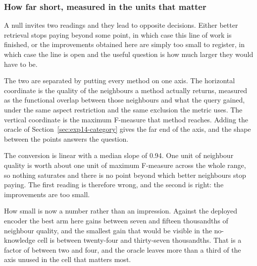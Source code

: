 \subsubsection{How far short, measured in the units that matter}
\label{sec:exp14-conversion}

A null invites two readings and they lead to opposite decisions. Either better
retrieval stops paying beyond some point, in which case this line of work is finished,
or the improvements obtained here are simply too small to register, in which case the
line is open and the useful question is how much larger they would have to be.

The two are separated by putting every method on one axis. The horizontal coordinate
is the quality of the neighbours a method actually returns, measured as the functional
overlap between those neighbours and what the query gained, under the same aspect
restriction and the same exclusion the metric uses. The vertical coordinate is the
maximum F-measure that method reaches. Adding the oracle of
Section~\ref{sec:exp14-category} gives the far end of the axis, and the shape between
the points answers the question.

\begin{table}[htbp]
  \centering
  \caption{The conversion from neighbour quality into maximum F-measure. Slope is
  measured between the deployed encoder and the oracle. \emph{Best gain} is the
  largest improvement in neighbour quality any encoder here achieves over the deployed
  one; \emph{needed} is the improvement at which the difference would reach half the
  width of that cell's confidence interval.}
  \label{tab:exp14-conversion}
  
\end{table}

The conversion is linear with a median slope of 0.94. One unit of neighbour quality is
worth about one unit of maximum F-measure across the whole range, so nothing saturates
and there is no point beyond which better neighbours stop paying. The first reading is
therefore wrong, and the second is right: the improvements are too small.

How small is now a number rather than an impression. Against the deployed encoder the
best arm here gains between seven and fifteen thousandths of neighbour quality, and
the smallest gain that would be visible in the no-knowledge cell is between
twenty-four and thirty-seven thousandths. That is a factor of between two and four,
and the oracle leaves more than a third of the axis unused in the cell that matters
most.

